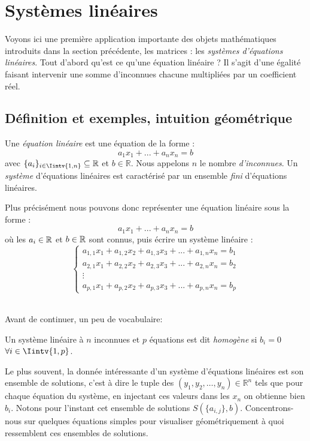\chapter{Systèmes linéaires}

\noindent Voyons ici une première application importante des objets mathématiques introduits dans la section précédente, les matrices : les \textit{systèmes d'équations linéaires}. Tout d'abord qu'est ce qu'une équation linéaire ? Il s'agit d'une égalité faisant intervenir une somme d'inconnues chacune multipliées par un coefficient réel. 

\section{Définition et exemples, intuition géométrique}
\begin{boxdef}
\noindent Une \textit{équation linéaire} est une équation de la forme : 
$$a_1 x_1 + ... + a_n x_n = b$$
avec $\{a_i \}_{i \in \Iintv{1,n}} \subseteq \mathbb{R}$ et $b\in \mathbb{R}$. Nous appelons $n$ le nombre \textit{d'inconnues}. Un \textit{système} d'équations linéaires est caractérisé par un ensemble \textit{fini} d'équations linéaires.
\end{boxdef}
Plus précisément nous pouvons donc représenter une équation linéaire sous la forme :
$$a_1 x_1 + ... + a_n x_n = b
$$
où les $a_i \in \mathbb{R}$ et $b \in \mathbb{R}$ sont connus, puis écrire un système linéaire :
$$\begin{cases} a_{1,1}x_1 + a_{1,2}x_2 + a_{1,3}x_3 + ... + a_{1, n}x_n = b_1 \\ a_{2,1}x_1 + a_{2,2}x_2 + a_{2,3}x_3 + ... + a_{2, n}x_n =b_2 \\ \vdots \\ a_{p,1}x_1 + a_{p,2}x_2 + a_{p,3}x_3 + ... + a_{p, n}x_n = b_p \end{cases}$$

\, \\
Avant de continuer, un peu de vocabulaire:
\begin{boxdef}
Un système linéaire à $n$ inconnues et $p$ équations est dit \textit{homogène} si $b_i = 0$ $\forall i \in \Iintv{1, p}$.
\end{boxdef}

\noindent Le plus souvent, la donnée intéressante d'un système d'équations linéaires est son ensemble de solutions, c'est à dire le tuple des $(y_1, y_2, \ldots, y_n)\in \mathbb{R}^n$ tels que pour chaque équation du système, en injectant ces valeurs dans les $x_n$ on obtienne bien $b_i$. Notons pour l'instant cet ensemble de solutions $S(\{a_{i,j}\},b)$. Concentrons-nous sur quelques équations simples pour visualiser géométriquement à quoi ressemblent ces ensembles de solutions.\\


